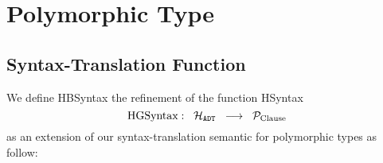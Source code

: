 \section{Polymorphic Type}
\subsection{Syntax-Translation Function}\label{subsec:polymorphic-types-function}
We define HBSyntax the refinement of the function HSyntax $$\text{HGSyntax} :\;\; \mathcal{H}_{\texttt{ADT}} \;\; \longrightarrow \;\; \mathcal{P}_{\text{Clause}}$$ as an extension of our syntax-translation semantic for polymorphic types as follow:\\
\small


